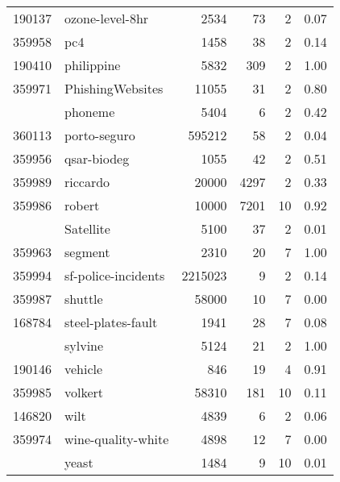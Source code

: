 \begin{longtable}{rlrrrp{2em}}
190137 & ozone-level-8hr & 2534 & 73 & 2 & 0.07 \\
359958 & pc4 & 1458 & 38 & 2 & 0.14 \\
190410 & philippine & 5832 & 309 & 2 & 1.00 \\
359971 & PhishingWebsites & 11055 & 31 & 2 & 0.80 \\
\addlinespace
168350 & phoneme & 5404 & 6 & 2 & 0.42 \\
360113 & porto-seguro & 595212 & 58 & 2 & 0.04 \\
359956 & qsar-biodeg & 1055 & 42 & 2 & 0.51 \\
359989 & riccardo & 20000 & 4297 & 2 & 0.33 \\
359986 & robert & 10000 & 7201 & 10 & 0.92 \\
\addlinespace
359975 & Satellite & 5100 & 37 & 2 & 0.01 \\
359963 & segment & 2310 & 20 & 7 & 1.00 \\
359994 & sf-police-incidents & 2215023 & 9 & 2 & 0.14 \\
359987 & shuttle & 58000 & 10 & 7 & 0.00 \\
168784 & steel-plates-fault & 1941 & 28 & 7 & 0.08 \\
\addlinespace
359972 & sylvine & 5124 & 21 & 2 & 1.00 \\
190146 & vehicle & 846 & 19 & 4 & 0.91 \\
359985 & volkert & 58310 & 181 & 10 & 0.11 \\
146820 & wilt & 4839 & 6 & 2 & 0.06 \\
359974 & wine-quality-white & 4898 & 12 & 7 & 0.00 \\
\addlinespace
2073 & yeast & 1484 & 9 & 10 & 0.01 \\
\bottomrule
\end{longtable}
